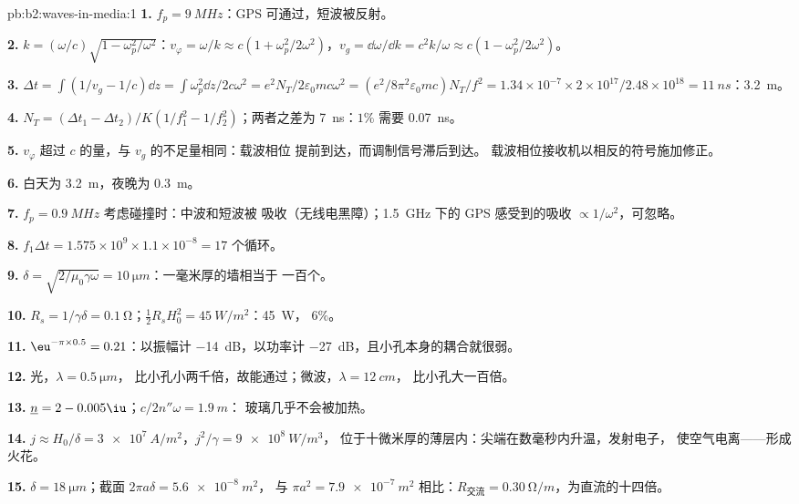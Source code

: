 \begin{solution}{pb:b2:waves-in-media:1}
\textbf{1.} $f_p = \qty{9}{MHz}$：GPS 可通过，短波被反射。

\textbf{2.} $k = (\omega/c)\sqrt{1 - \omega_p^2/\omega^2}$：$v_\varphi = \omega/k \approx c(1 + \omega_p^2/
2\omega^2)$，$v_g = \dd\omega/\dd k = c^2k/\omega \approx c(1 - \omega_p^2/2\omega^2)$。

\textbf{3.} $\Delta t = \int(1/v_g - 1/c)\dd z = \int\omega_p^2\dd z/2c\omega^2 = e^2N_T/2\varepsilon_0
mc\omega^2 = (e^2/8\pi^2\varepsilon_0mc)N_T/f^2 = 1.34 \times 10^{-7} \times 2 \times 10^{17}/2.48 \times
10^{18} = \qty{11}{ns}$：\qty{3.2}{m}。

\textbf{4.} $N_T = (\Delta t_1 - \Delta t_2)/K(1/f_1^2 - 1/f_2^2)$；两者之差为
\qty{7}{ns}：$1\%$ 需要 \qty{0.07}{ns}。

\textbf{5.} $v_\varphi$ 超过 $c$ 的量，与 $v_g$ 的不足量相同：载波相位
提前到达，而调制信号滞后到达。
载波相位接收机以相反的符号施加修正。

\textbf{6.} 白天为 \qty{3.2}{m}，夜晚为 \qty{0.3}{m}。

\textbf{7.} $f_p = \qty{0.9}{MHz}$ 考虑碰撞时：中波和短波被
吸收（无线电黑障）；\qty{1.5}{GHz} 下的 GPS 感受到的吸收
$\propto 1/\omega^2$，可忽略。

\textbf{8.} $f_1\Delta t = 1.575 \times 10^9 \times 1.1 \times 10^{-8} = 17$ 个循环。

\textbf{9.} $\delta = \sqrt{2/\mu_0\gamma\omega} = \qty{10}{\micro m}$：一毫米厚的墙相当于
一百个。

\textbf{10.} $R_s = 1/\gamma\delta = \qty{0.1}{\ohm}$；$\tfrac12R_sH_0^2 = \qty{45}{W/m^2}$：\qty{45}{W}，
$6\%$。

\textbf{11.} $\eu^{-\pi \times 0.5} = 0.21$：以振幅计 \qty{-14}{dB}，以功率计
\qty{-27}{dB}，且小孔本身的耦合就很弱。

\textbf{12.} 光，$\lambda = \qty{0.5}{\micro m}$，
比小孔小两千倍，故能通过；微波，$\lambda = \qty{12}{cm}$，
比小孔大一百倍。

\textbf{13.} $\underline n = 2 - 0.005\iu$；$c/2n''\omega = \qty{1.9}{m}$：
玻璃几乎不会被加热。

\textbf{14.} $j \approx H_0/\delta = \qty{3e7}{A/m^2}$，$j^2/\gamma = \qty{9e8}{W/m^3}$，
位于十微米厚的薄层内：尖端在数毫秒内升温，发射电子，
使空气电离——形成火花。

\textbf{15.} $\delta = \qty{18}{\micro m}$；截面 $2\pi a\delta = \qty{5.6e-8}{m^2}$，
与 $\pi a^2 = \qty{7.9e-7}{m^2}$ 相比：$R_{\text{交流}} = \qty{0.30}{\ohm/m}$，为直流的十四倍。


\end{solution}
